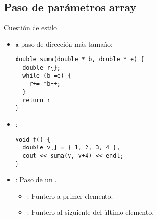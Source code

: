 \subsection{Paso de parámetros array}

\begin{frame}[t,fragile]{Cuestión de estilo}
\begin{itemize}
  \item {} a paso de dirección más tamaño:
\begin{lstlisting}
double suma(double * b, double * e) {
  double r{};
  while (b!=e) {
    r+= *b++;
  }
  return r;
}
\end{lstlisting}

  \item {}:
\begin{lstlisting}
void f() {
  double v[] = { 1, 2, 3, 4 };
  cout << suma(v, v+4) << endl;
}
\end{lstlisting}

  \item {}: Paso de un .
    \begin{itemize}
      \item {}: Puntero a primer elemento.
      \item {}: Puntero al siguiente del último elemento.
    \end{itemize}
\end{itemize}
\end{frame}


